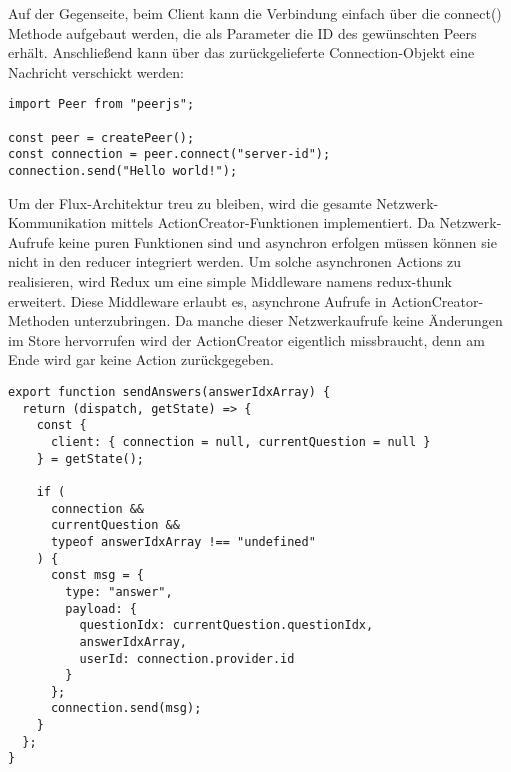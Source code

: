 Auf der Gegenseite, beim Client kann die Verbindung einfach über die connect() Methode aufgebaut werden, die als Parameter die ID des gewünschten Peers erhält. Anschließend kann über das zurückgelieferte Connection-Objekt eine Nachricht verschickt werden:

\begin{minipage}{\linewidth}
\begin{lstlisting}[caption={Verbindungsaufbau mit der PeerJS-Bibliothek auf der Client-Seite. (aus: src/client/actions/client.js)}]
import Peer from "peerjs";

const peer = createPeer();
const connection = peer.connect("server-id");
connection.send("Hello world!");
\end{lstlisting}
\end{minipage}

Um der Flux-Architektur treu zu bleiben, wird die gesamte Netzwerk-Kommunikation mittels ActionCreator-Funktionen implementiert. Da Netzwerk-Aufrufe keine puren Funktionen sind und asynchron erfolgen müssen können sie nicht in den reducer integriert werden. Um solche asynchronen Actions zu realisieren, wird Redux um eine simple Middleware namens redux-thunk\cite{web:redux_thunk} erweitert. Diese Middleware erlaubt es, asynchrone Aufrufe in ActionCreator-Methoden unterzubringen. Da manche dieser Netzwerkaufrufe keine Änderungen im Store hervorrufen wird der ActionCreator eigentlich missbraucht, denn am Ende wird gar keine Action zurückgegeben.

\begin{minipage}{\linewidth}
\begin{lstlisting}[caption={ActionCreator zum Versenden von Antworten vom Client zum Server. (aus: src/client/actions/client.js)}]
export function sendAnswers(answerIdxArray) {
  return (dispatch, getState) => {
    const {
      client: { connection = null, currentQuestion = null }
    } = getState();

    if (
      connection &&
      currentQuestion &&
      typeof answerIdxArray !== "undefined"
    ) {
      const msg = {
        type: "answer",
        payload: {
          questionIdx: currentQuestion.questionIdx,
          answerIdxArray,
          userId: connection.provider.id
        }
      };
      connection.send(msg);
    }
  };
}
\end{lstlisting}
\end{minipage}